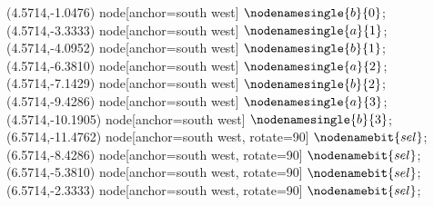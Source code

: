   (4.5714,-1.0476) node[anchor=south west] {$\nodenamesingle{b}{0}$};
   (4.5714,-3.3333) node[anchor=south west] {$\nodenamesingle{a}{1}$};
   (4.5714,-4.0952) node[anchor=south west] {$\nodenamesingle{b}{1}$};
   (4.5714,-6.3810) node[anchor=south west] {$\nodenamesingle{a}{2}$};
   (4.5714,-7.1429) node[anchor=south west] {$\nodenamesingle{b}{2}$};
   (4.5714,-9.4286) node[anchor=south west] {$\nodenamesingle{a}{3}$};
   (4.5714,-10.1905) node[anchor=south west] {$\nodenamesingle{b}{3}$};
   (6.5714,-11.4762) node[anchor=south west, rotate=90] {$\nodenamebit{sel}$};
   (6.5714,-8.4286) node[anchor=south west, rotate=90] {$\nodenamebit{sel}$};
   (6.5714,-5.3810) node[anchor=south west, rotate=90] {$\nodenamebit{sel}$};
   (6.5714,-2.3333) node[anchor=south west, rotate=90] {$\nodenamebit{sel}$};
